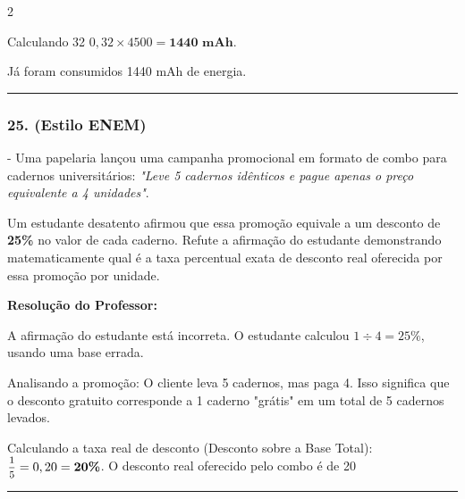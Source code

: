 \begin{multicols*}{2}
\begin{tcolorbox}[colback=CorTitUm!5, colframe=CorTitUm, boxrule=1pt, arc=4pt, left=6pt, right=6pt, top=6pt, bottom=6pt]
    Calculando 32%
    $0,32 \times 4500 = \textbf{1440 mAh}$.
    
    Já foram consumidos 1440 mAh de energia.
    \end{tcolorbox}
\fi

\par\vspace{\espacoQuestao}

\noindent\textcolor{CorLinha}{\rule{\linewidth}{0.5pt}} 
\par\vspace{\espacoPreQuestao}
\subsubsection*{25. (Estilo ENEM)} - Uma papelaria lançou uma campanha promocional em formato de combo para cadernos universitários: \textit{"Leve 5 cadernos idênticos e pague apenas o preço equivalente a 4 unidades"}. 

Um estudante desatento afirmou que essa promoção equivale a um desconto de \textbf{25\%} no valor de cada caderno. Refute a afirmação do estudante demonstrando matematicamente qual é a taxa percentual exata de desconto real oferecida por essa promoção por unidade.

\ifgabarito
    \begin{tcolorbox}[colback=CorTitUm!5, colframe=CorTitUm, boxrule=1pt, arc=4pt, left=6pt, right=6pt, top=6pt, bottom=6pt]
    \small\textbf{\textcolor{CorTitUm}{Resolução do Professor:}}\par\vspace{0.1cm}
    \color{CinzaEscuro}
    A afirmação do estudante está incorreta. O estudante calculou $1 \div 4 = 25\%$, usando uma base errada.
    
    Analisando a promoção: O cliente leva 5 cadernos, mas paga 4. 
    Isso significa que o desconto gratuito corresponde a 1 caderno "grátis" em um total de 5 cadernos levados.
    
    Calculando a taxa real de desconto (Desconto sobre a Base Total):
    $\mfrac{1}{5} = 0,20 = \textbf{20\%}$.
    O desconto real oferecido pelo combo é de 20%
    \end{tcolorbox}
\fi

\par\vspace{\espacoQuestao}
\noindent\textcolor{CorLinha}{\rule{\linewidth}{0.5pt}} 
\par\vspace{\espacoPreQuestao}

\end{multicols*}
